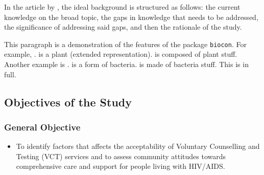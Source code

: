 \documentclass{strrespaper-trad}
\begin{document}
			In the article  by \citeauthor{sachdevHowWriteBackground2018}, the ideal background is structured as follows: the current knowledge on the broad topic, the gaps in knowledge that needs to be addressed, the significance of addressing said gaps, and then the rationale of the study.

			This paragraph is a demonstration of the features of the package \texttt{biocon}. For example, .
			 is a plant (extended representation).
			 is composed of plant stuff.
			Another example is .
			 is a form of bacteria.
			 is made of bacteria stuff.
			This is  in full.

			\lipsum[2]

		\subsection{Objectives of the Study}
			\nocite{theopenuniversityHealthManagementEthics2017}
			\subsubsection{General Objective}
				\begin{itemize}
					\item To identify factors that affects the acceptability of Voluntary Counselling and Testing (VCT) services and to assess community attitudes towards comprehensive care and support for people living with HIV/AIDS.
				\end{itemize}
\end{document}
